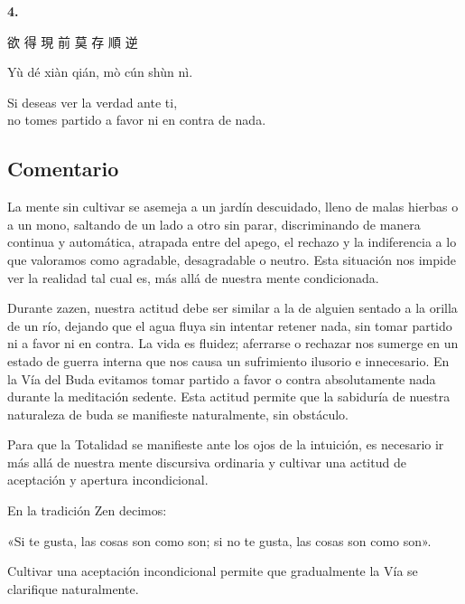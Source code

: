 \documentclass[
  a5paperpaper,
]{article}
\begin{document}
\hfill\break

\hypertarget{04}{}
\begin{verseblock}

\newpage

\begin{center}\textbf{4.}\end{center}

欲 得 現 前 莫 存 順 逆

Yù dé xiàn qián, mò cún shùn nì.

Si deseas ver la verdad ante ti,\\
no tomes partido a favor ni en contra de nada.

\end{verseblock}

\hfill\break

\hypertarget{comentario-3}{%
\subsection{Comentario}\label{comentario-3}}

La mente sin cultivar se asemeja a un jardín descuidado, lleno de malas
hierbas o a un mono, saltando de un lado a otro sin parar, discriminando
de manera continua y automática, atrapada entre del apego, el rechazo y
la indiferencia a lo que valoramos como agradable, desagradable o
neutro. Esta situación nos impide ver la realidad tal cual es, más allá
de nuestra mente condicionada.

Durante zazen, nuestra actitud debe ser similar a la de alguien sentado
a la orilla de un río, dejando que el agua fluya sin intentar retener
nada, sin tomar partido ni a favor ni en contra. La vida es fluidez;
aferrarse o rechazar nos sumerge en un estado de guerra interna que nos
causa un sufrimiento ilusorio e innecesario. En la Vía del Buda evitamos
tomar partido a favor o contra absolutamente nada durante la meditación
sedente. Esta actitud permite que la sabiduría de nuestra naturaleza de
buda se manifieste naturalmente, sin obstáculo.

Para que la Totalidad se manifieste ante los ojos de la intuición, es
necesario ir más allá de nuestra mente discursiva ordinaria y cultivar
una actitud de aceptación y apertura incondicional.

En la tradición Zen decimos:

«Si te gusta, las cosas son como son; si no te gusta, las cosas son como
son».

Cultivar una aceptación incondicional permite que gradualmente la Vía se
clarifique naturalmente.
\end{document}
